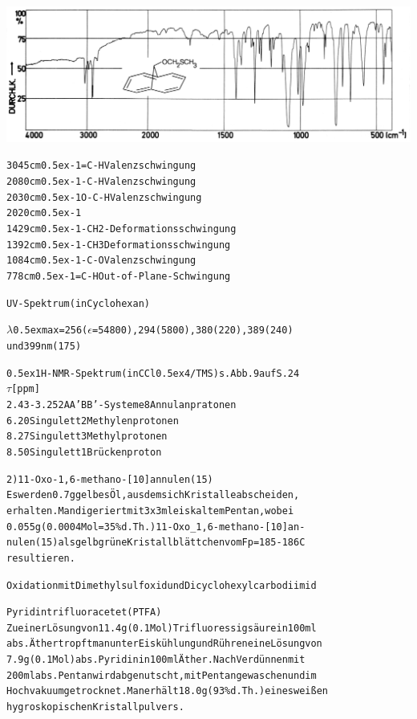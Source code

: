 \documentclass[a4paper,11pt]{article}
\begin{document}
\hspace*{-0.4cm}\includegraphics[width=15.08cm]{IR_036}
\begin{alltt}

3045 cm\raise0.5ex\hbox{-1}    =C-H     Valenzschwingung
2080 cm\raise0.5ex\hbox{-1}    -C-H     Valenzschwingung
2030 cm\raise0.5ex\hbox{-1}    O-C-H    Valenzschwingung
2020 cm\raise0.5ex\hbox{-1}
1429 cm\raise0.5ex\hbox{-1}    -CH2-    Deformationsschwingung
1392 cm\raise0.5ex\hbox{-1}    -CH3     Deformationsschwingung
1084 cm\raise0.5ex\hbox{-1}    -C-O     Valenzschwingung
 778 cm\raise0.5ex\hbox{-1}    =C-H     Out-of-Plane-Schwingung


UV-Spektrum (in Cyclohexan)

\(\lambda\)\lower0.5ex\hbox{max} = 256 (\(\epsilon\) = 54800), 294 (5800), 380 (220), 389 (240)
und 399 nm (175)

\leavevmode\raise0.5ex\hbox{1}H-NMR-Spektrum (in CCl\lower0.5ex\hbox{4}/TMS) s. Abb. 9 auf S. 24
  \(\tau\) [ppm]
2.43 - 3.25      2 AA'BB'-Systeme     8 Annulanpratonen
6.20             Singulett            2 Methylenprotonen
8.27             Singulett            3 Methylprotonen
8.50             Singulett            1 Brückenproton

\newpage
{}


2) 11-Oxo-1,6-methano-[10]annulen (15)
   Es werden 0.7 g gelbes Öl, aus dem sich Kristalle abscheiden,
   erhalten. Man digeriert mit 3 x 3 ml eiskaltem Pentan, wobei
   0.055 g (0.0004 Mol = 35 \% d.Th.) 11-Oxo_1‚6-methano-[10]an-
   nulen (15) als gelbgrüne Kristallblättchen vom Fp = 185 - 186\degree{}C
   resultieren.


Oxidation mit Dimethylsulfoxid und Dicyclohexylcarbodiimid

Pyridintrifluoracetet (PTFA)
Zu einer Lösung von 11.4 g (0.1 Mol) Trifluoressigsäure in 100 ml
abs. Äther tropft man unter Eiskühlung und Rühren eine Lösung von
7.9 g (0.1 Mol) abs. Pyridin in 100 ml Äther. Nach Verdünnen mit
200 ml abs. Pentan wird abgenutscht, mit Pentan gewaschen und im
Hochvakuum getrocknet. Man erhält 18.0 g (93 \% d.Th.) eines weißen
hygroskopischen Kristallpulvers.


\end{alltt}
\end{document}
